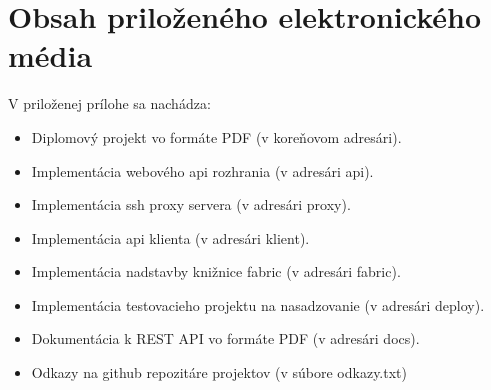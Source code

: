 \renewcommand\chaptername{Príloha}

\chapter{Obsah priloženého elektronického média}

\renewcommand*{\thepage}{B\arabic{page}}
\setcounter{page}{1}

V priloženej prílohe sa nachádza:

\begin{itemize}
    \item Diplomový projekt vo formáte PDF (v koreňovom adresári).
    \item Implementácia webového api rozhrania (v adresári api).
    \item Implementácia ssh proxy servera (v adresári proxy).
    \item Implementácia api klienta (v adresári klient).
    \item Implementácia nadstavby knižnice fabric (v adresári fabric).
    \item Implementácia testovacieho projektu na nasadzovanie (v adresári deploy).
    \item Dokumentácia k REST API vo formáte PDF (v adresári docs).
    \item Odkazy na github repozitáre projektov (v súbore odkazy.txt)
\end{itemize}
